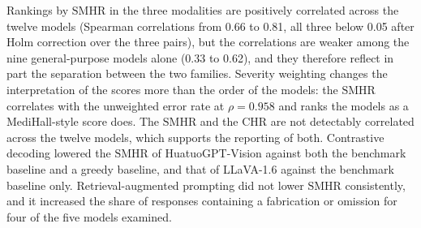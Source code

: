 \documentclass[11pt,a4paper]{article}
\newcommand{\SMHR}{\ensuremath{\mathrm{SMHR}}}
\newcommand{\CHR}{\ensuremath{\mathrm{CHR}}}
\begin{document}
Rankings by \SMHR{} in the three modalities are positively correlated across the twelve models (Spearman correlations from 0.66 to 0.81, all three below 0.05 after Holm correction over the three pairs), but the correlations are weaker among the nine general-purpose models alone (0.33 to 0.62), and they therefore reflect in part the separation between the two families. Severity weighting changes the interpretation of the scores more than the order of the models: the \SMHR{} correlates with the unweighted error rate at $\rho=0.958$ and ranks the models as a MediHall-style score does. The \SMHR{} and the \CHR{} are not detectably correlated across the twelve models, which supports the reporting of both. Contrastive decoding lowered the \SMHR{} of HuatuoGPT-Vision against both the benchmark baseline and a greedy baseline, and that of LLaVA-1.6 against the benchmark baseline only. Retrieval-augmented prompting did not lower \SMHR{} consistently, and it increased the share of responses containing a fabrication or omission for four of the five models examined.
\end{document}

